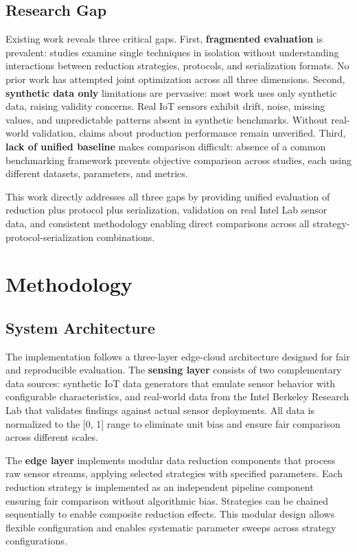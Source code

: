 \documentclass[10pt,twocolumn]{article}
\begin{document}
\vspace{0.15cm}

\subsection{Research Gap}

Existing work reveals three critical gaps. First, \textbf{fragmented evaluation} is prevalent: studies examine single techniques in isolation without understanding interactions between reduction strategies, protocols, and serialization formats. No prior work has attempted joint optimization across all three dimensions. Second, \textbf{synthetic data only} limitations are pervasive: most work uses only synthetic data, raising validity concerns. Real IoT sensors exhibit drift, noise, missing values, and unpredictable patterns absent in synthetic benchmarks. Without real-world validation, claims about production performance remain unverified. Third, \textbf{lack of unified baseline} makes comparison difficult: absence of a common benchmarking framework prevents objective comparison across studies, each using different datasets, parameters, and metrics.

This work directly addresses all three gaps by providing unified evaluation of reduction plus protocol plus serialization, validation on real Intel Lab sensor data, and consistent methodology enabling direct comparisons across all strategy-protocol-serialization combinations.

\section{Methodology}

\subsection{System Architecture}

The implementation follows a three-layer edge-cloud architecture designed for fair and reproducible evaluation. The \textbf{sensing layer} consists of two complementary data sources: synthetic IoT data generators that emulate sensor behavior with configurable characteristics, and real-world data from the Intel Berkeley Research Lab that validates findings against actual sensor deployments. All data is normalized to the [0, 1] range to eliminate unit bias and ensure fair comparison across different scales.

The \textbf{edge layer} implements modular data reduction components that process raw sensor streams, applying selected strategies with specified parameters. Each reduction strategy is implemented as an independent pipeline component ensuring fair comparison without algorithmic bias. Strategies can be chained sequentially to enable composite reduction effects. This modular design allows flexible configuration and enables systematic parameter sweeps across strategy configurations.
\end{document}
